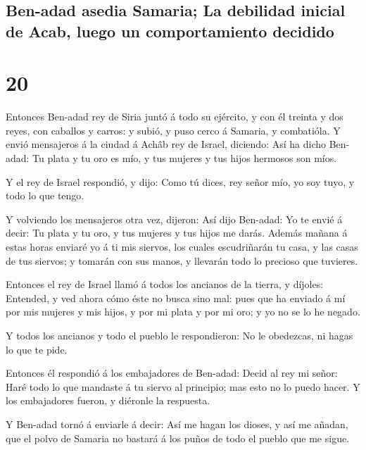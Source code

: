 \hypertarget{ben-adad-asedia-samaria-la-debilidad-inicial-de-acab-luego-un-comportamiento-decidido}{%
\subsection{Ben-adad asedia Samaria; La debilidad inicial de Acab, luego
un comportamiento
decidido}\label{ben-adad-asedia-samaria-la-debilidad-inicial-de-acab-luego-un-comportamiento-decidido}}

\hypertarget{section-19}{%
\section{20}\label{section-19}}

 Entonces Ben-adad rey de Siria juntó á todo su ejército,
y con él treinta y dos reyes, con caballos y carros: y subió, y puso
cerco á Samaria, y combatióla.  Y envió mensajeros á la
ciudad á Achâb rey de Israel, diciendo:  Así ha dicho
Ben-adad: Tu plata y tu oro es mío, y tus mujeres y tus hijos hermosos
son míos.

 Y el rey de Israel respondió, y dijo: Como tú dices, rey
señor mío, yo soy tuyo, y todo lo que tengo.

 Y volviendo los mensajeros otra vez, dijeron: Así dijo
Ben-adad: Yo te envié á decir: Tu plata y tu oro, y tus mujeres y tus
hijos me darás.  Además mañana á estas horas enviaré yo á
ti mis siervos, los cuales escudriñarán tu casa, y las casas de tus
siervos; y tomarán con sus manos, y llevarán todo lo precioso que
tuvieres.

 Entonces el rey de Israel llamó á todos los ancianos de
la tierra, y díjoles: Entended, y ved ahora cómo éste no busca sino mal:
pues que ha enviado á mí por mis mujeres y mis hijos, y por mi plata y
por mi oro; y yo no se lo he negado.

 Y todos los ancianos y todo el pueblo le respondieron: No
le obedezcas, ni hagas lo que te pide.

 Entonces él respondió á los embajadores de Ben-adad:
Decid al rey mi señor: Haré todo lo que mandaste á tu siervo al
principio; mas esto no lo puedo hacer. Y los embajadores fueron, y
diéronle la respuesta.

 Y Ben-adad tornó á enviarle á decir: Así me hagan los
dioses, y así me añadan, que el polvo de Samaria no bastará á los puños
de todo el pueblo que me sigue.

